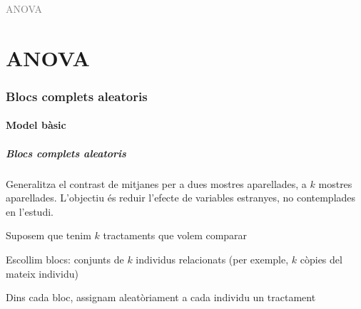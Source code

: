 \documentclass[12pt,t]{beamer}
\title[\red{Matemàtiques III}]{}
\author[]{}
\date{}
\newcommand{\gray}[1]{\textcolor{gray}{#1}}
\renewcommand{\emph}[1]{{\color{red}#1}}
\theoremstyle{plain}
\theoremstyle{definition}
\begin{document}
\beamertemplatedotitem

\lstset{breaklines=true}
\lstset{basicstyle=\ttfamily}


\begin{frame}
\vfill
\begin{center}
\gray{\LARGE ANOVA}
\end{center}
\vfill
\end{frame}




 


\part{ANOVA}
% 

 
\section{Blocs complets aleatoris}
\subsection{Model bàsic}
\begin{frame}
\frametitle{Blocs complets aleatoris}

Generalitza el contrast de mitjanes  per a dues mostres aparellades, a $k$ mostres aparellades. L'objectiu és reduir l'efecte de variables estranyes, no contemplades en l'estudi.
\medskip

Suposem que tenim $k$ tractaments que volem comparar
\medskip

Escollim \emph{blocs}: conjunts de $k$ individus relacionats  (per exemple, $k$ còpies del mateix individu)
\medskip

Dins cada bloc, assignam aleatòriament a cada individu un tractament
\end{frame}
\end{document}
